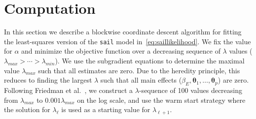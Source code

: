 \documentclass[12pt,letter]{article}\usepackage[]{graphicx}\usepackage[]{color}
\newcommand{\xmark}{\ding{55}}%
\newcommand{\btheta}{\boldsymbol{\theta}}
\begin{document}

\section{Computation} \label{sec:sail_algorithm}

In this section we describe a blockwise coordinate descent algorithm for fitting the least-squares version of the \texttt{sail} model in~\eqref{eq:saillikelihood}. We fix the value for $\alpha$ and minimize the objective function over a decreasing sequence of $\lambda$ values ($\lambda_{max}>\cdots>\lambda_{min}$). We use the subgradient equations to determine the maximal value $\lambda_{max}$ such that all estimates are zero. Due to the heredity principle, this reduces to finding the largest $\lambda$ such that all main effects ($\beta_E, \btheta_1, \ldots, \btheta_p$) are zero. Following Friedman et al.~\citep{friedman2010regularization}, we construct a $\lambda$-sequence of 100 values decreasing from $\lambda_{max}$ to $0.001 \lambda_{max}$ on the log scale, and use the warm start strategy where the solution for $\lambda_{\ell}$ is used as a starting value for $\lambda_{\ell + 1}$.
\end{document}
